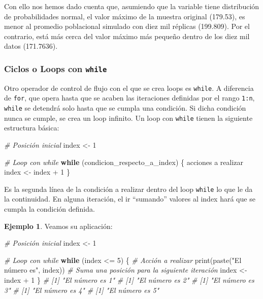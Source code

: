 \documentclass[
]{article}
\newenvironment{Shaded}{\begin{snugshade}}{\end{snugshade}}
\newcommand{\CommentTok}[1]{\textcolor[rgb]{0.56,0.35,0.01}{\textit{#1}}}
\newcommand{\ControlFlowTok}[1]{\textcolor[rgb]{0.13,0.29,0.53}{\textbf{#1}}}
\newcommand{\DecValTok}[1]{\textcolor[rgb]{0.00,0.00,0.81}{#1}}
\newcommand{\FunctionTok}[1]{\textcolor[rgb]{0.00,0.00,0.00}{#1}}
\newcommand{\NormalTok}[1]{#1}
\newcommand{\OtherTok}[1]{\textcolor[rgb]{0.56,0.35,0.01}{#1}}
\newcommand{\SpecialCharTok}[1]{\textcolor[rgb]{0.00,0.00,0.00}{#1}}
\newcommand{\StringTok}[1]{\textcolor[rgb]{0.31,0.60,0.02}{#1}}
\theoremstyle{definition}
\theoremstyle{definition}
\newtheorem{example}{Ejemplo}[section]
\theoremstyle{definition}
\theoremstyle{definition}
\theoremstyle{remark}
\begin{document}
Con ello nos hemos dado cuenta que, asumiendo que la variable tiene distribución de probabilidades normal, el valor máximo de la muestra original (179.53), es menor al promedio poblacional simulado con diez mil réplicas (199.809). Por el contrario, está más cerca del valor máximo más pequeño dentro de los diez mil datos (171.7636).

\hypertarget{ciclos-o-loops-con-while}{%
\subsubsection{\texorpdfstring{Ciclos o Loops con \texttt{while}}{Ciclos o Loops con while}}\label{ciclos-o-loops-con-while}}

Otro operador de control de flujo con el que se crea loops es \texttt{while}. A diferencia de \texttt{for}, que opera hasta que se acaben las iteraciones definidas por el rango \texttt{1:n}, \texttt{while} se detendrá solo hasta que se cumpla una condición. Si dicha condición nunca se cumple, se crea un loop infinito. Un loop con \texttt{while} tienen la siguiente estructura básica:

\begin{Shaded}
\begin{Highlighting}[]
\CommentTok{\# Posición inicial}
\NormalTok{index }\OtherTok{\textless{}{-}} \DecValTok{1}

\CommentTok{\# Loop con while}
\ControlFlowTok{while}\NormalTok{ (condicion\_respecto\_a\_index) \{}
\NormalTok{  acciones a realizar}
\NormalTok{  index }\OtherTok{\textless{}{-}}\NormalTok{ index }\SpecialCharTok{+} \DecValTok{1}
\NormalTok{  \}}
\end{Highlighting}
\end{Shaded}

Es la segunda línea de la condición a realizar dentro del loop \texttt{while} lo que le da la continuidad. En alguna iteración, el ir ``sumando'' valores al index hará que se cumpla la condición definida.

\begin{example}

Veamos su aplicación:

\begin{Shaded}
\begin{Highlighting}[]
\CommentTok{\# Posición inicial}
\NormalTok{index }\OtherTok{\textless{}{-}} \DecValTok{1}

\CommentTok{\# Loop con while}
\ControlFlowTok{while}\NormalTok{ (index }\SpecialCharTok{\textless{}=} \DecValTok{5}\NormalTok{) \{}
  \CommentTok{\# Acción a realizar}
  \FunctionTok{print}\NormalTok{(}\FunctionTok{paste}\NormalTok{(}\StringTok{"El número es"}\NormalTok{, index))}
  \CommentTok{\# Suma una posición para la siguiente iteración}
\NormalTok{  index }\OtherTok{\textless{}{-}}\NormalTok{ index }\SpecialCharTok{+} \DecValTok{1}
\NormalTok{\}}
\CommentTok{\# [1] "El número es 1"}
\CommentTok{\# [1] "El número es 2"}
\CommentTok{\# [1] "El número es 3"}
\CommentTok{\# [1] "El número es 4"}
\CommentTok{\# [1] "El número es 5"}
\end{Highlighting}
\end{Shaded}

\end{example}
\end{document}
